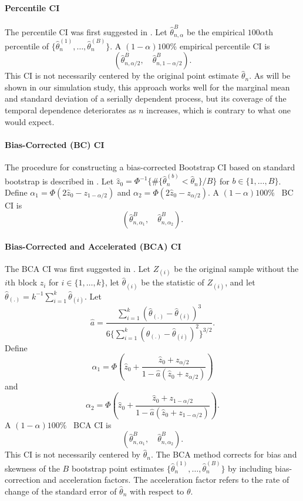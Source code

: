 \documentclass[10pt]{article}
\begin{document}
\paragraph{Percentile CI}
The percentile CI was first suggested in \citet{efron1979bootstrap}.
Let $\hat\theta_{n, \alpha}^B$ be the empirical $100\alpha$th percentile of
$\{\hat\theta_n^{(1)}, \ldots, \hat\theta_n^{(B)}\}$. 
A $(1 - \alpha)100\%$ empirical percentile CI is
\[
(\hat\theta_{n, \alpha/2}^{B}, \quad \hat\theta_{n, 1 - \alpha/2}^{B}).
\]
This CI is not necessarily centered by the original point estimate 
$\hat\theta_n$. As will be shown in our simulation study, this approach works 
well for the marginal mean and standard deviation of a serially dependent 
process, but its coverage of the temporal dependence deteriorates as $n$ 
increases, which is contrary to what one would expect.


\paragraph{Bias-Corrected (BC) CI}
The procedure for constructing a bias-corrected Bootstrap CI based on standard
bootstrap is described in \citet{carpenter2000bootstrap}. Let
$\hat{z}_0 = \Phi^{-1}\{\#\{\hat\theta_n^{(b)} < \hat{\theta}_n\} / B\}$ for
$b \in \{1, \ldots, B\}$. Define 
$\alpha_1 = \Phi(2\hat{z}_0 - z_{1 - \alpha/2})$ 
and $\alpha_2 = \Phi(2\hat{z}_0 - z_{\alpha/2})$. 
A $(1 - \alpha)100\%$ ~BC CI is
\[
(\hat\theta_{n, \alpha_1}^{B}, \quad \hat\theta_{n, \alpha_2}^{B}).
\]


\paragraph{Bias-Corrected and Accelerated (BCA) CI}
The BCA CI was first suggested in \citet{efron1987better}. Let $Z_{(i)}$ be the 
original sample without the $i$th block $z_i$ for $i \in \{1, \ldots, k\}$, let 
$\hat{\theta}_{(i)}$ be the statistic of $Z_{(i)}$, and let 
$\hat{\theta}_{(.)} = k^{-1}\sum_{i=1}^{k} \hat{\theta}_{(i)}$. 
Let
\begin{equation*}
\hat{a} = \frac{\sum_{i=1}^{k} (\hat{\theta}_{(.)} -
  \hat{\theta}_{(i)})^3}{6\{\sum_{i=1}^{k} (\hat{\theta}_{(.)} -
  \hat{\theta}_{(i)})^2\}^{3/2}}.
\end{equation*}
Define
\begin{equation*}
\alpha_1 = \Phi\left(\hat{z}_{0} + \frac{\hat{z}_{0} +
  z_{\alpha/2}}{1 - \hat{a}(\hat{z}_{0} + z_{\alpha/2})}\right)
\end{equation*}
and
\begin{equation*}
\alpha_2 = \Phi\left(\hat{z}_{0} + \frac{\hat{z}_{0} +
  z_{1 - \alpha/2}}{1 - \hat{a}(\hat{z}_{0} + z_{1 - \alpha/2})}\right).
\end{equation*}
A $(1 - \alpha)100\%$ ~BCA CI is
\[
(\hat\theta_{n, \alpha_1}^{B}, \quad \hat\theta_{n, \alpha_2}^{B}).
\]
This CI is not necessarily centered by $\hat\theta_n$. The BCA method corrects 
for bias and skewness of the $B$ bootstrap point estimates 
$\{\hat\theta_n^{(1)}, \ldots, \hat\theta_n^{(B)}\}$ by including 
bias-correction and acceleration factors. The acceleration factor refers to the 
rate of change of the standard error of $\hat\theta_n$ with respect to $\theta$.
\end{document}
